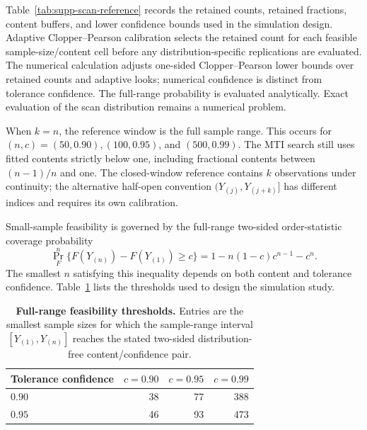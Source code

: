 \documentclass[11pt]{article}
\newcommand{\TableStyle}{\footnotesize\setlength{\tabcolsep}{4pt}\renewcommand{\arraystretch}{1.08}}
\begin{document}
Table~\ref{tab:supp-scan-reference} records the
retained counts, retained fractions, content buffers, and lower confidence
bounds used in the simulation design. Adaptive Clopper--Pearson calibration
selects the retained count for each feasible sample-size/content cell before
any distribution-specific replications are evaluated. The numerical calculation
adjusts one-sided Clopper--Pearson lower bounds over retained counts and
adaptive looks; numerical confidence is distinct from tolerance confidence.
The full-range probability is evaluated analytically. Exact evaluation of the
scan distribution remains a numerical problem.

When \(k=n\), the reference window is the full sample range. This occurs for
\((n,c)=(50,0.90),(100,0.95)\), and \((500,0.99)\). The MTI search still
uses fitted contents strictly below one, including fractional contents between
\((n-1)/n\) and one. The closed-window reference contains \(k\) observations
under continuity; the alternative half-open convention
\((Y_{(j)},Y_{(j+k)}]\) has different indices and requires its own calibration.

\begin{table}[H]
\centering
\caption{\textbf{Scan reference for the MTI fitted-content search.} The retained
count \(k\) is selected by adaptive Clopper--Pearson Monte Carlo scan
calibration. The content buffer is \(k/n-c\).}
\label{tab:supp-scan-reference}
\TableStyle

\end{table}

Small-sample feasibility is governed by the full-range two-sided order-statistic
coverage probability
\[
  \Pr_F^n\{F(Y_{(n)})-F(Y_{(1)})\ge c\}
  =
  1-n(1-c)c^{n-1}-c^n .
\]
The smallest \(n\) satisfying this inequality depends on both content and
tolerance confidence. Table~\ref{tab:supp-full-range-thresholds} lists the
thresholds used to design the simulation study.

\begin{table}[H]
\centering
\caption{\textbf{Full-range feasibility thresholds.} Entries are the smallest
sample sizes for which the sample-range interval \([Y_{(1)},Y_{(n)}]\) reaches
the stated two-sided distribution-free content/confidence pair.}
\label{tab:supp-full-range-thresholds}
\TableStyle
\begin{tabular}{@{}lrrr@{}}
\toprule
Tolerance confidence & \(c=0.90\) & \(c=0.95\) & \(c=0.99\)\\
\midrule
\(0.90\) & 38 & 77 & 388\\
\(0.95\) & 46 & 93 & 473\\
\bottomrule
\end{tabular}
\end{table}
\end{document}

